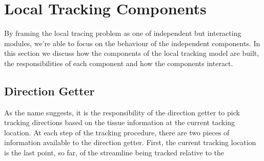 \section{Local Tracking Components}
    By framing the local tracing problem as one of independent but interacting modules, we're able to focus on the behaviour of the independent components. In this section we discuss how the components of the local tracking model are built, the responsibilities of each component and how the components interact.

\subsection{Direction Getter}
    As the name suggests, it is the responsibility of the direction getter to pick tracking directions based on the tissue information at the current tacking location. At each step of the tracking procedure, there are two pieces of information available to the direction getter. First, the current tracking location is the last point, so far, of the streamline being tracked relative to the 
    
